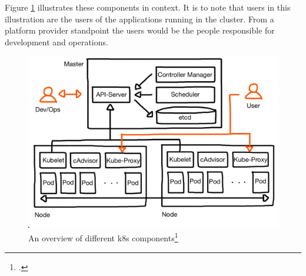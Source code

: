 Figure \ref{fig:k8s-big-picture} illustrates these components in context. It is to note that users in this illustration are the users of the applications running in the cluster. From a platform provider standpoint the users would be the people responsible for development and operations.

\begin{figure}
\centering
\includegraphics[scale=0.2]{pictures/big-picture.JPG}
\caption{An overview of different \gls{k8s} components\protect\footcite{nicoPictures}}
\label{fig:k8s-big-picture}
\end{figure}


